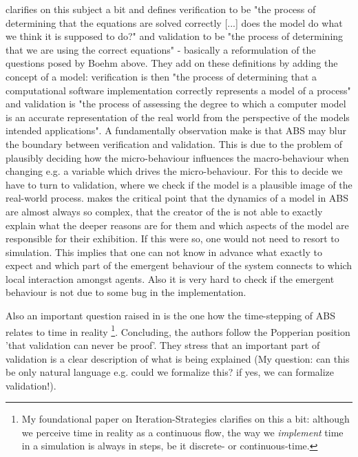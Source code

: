 \cite{ormerod_epistemological_2009} clarifies on this subject a bit and defines verification to be "the process of determining that the equations are solved correctly [...] does the model do what we think it is supposed to do?" and validation to be "the process of determining that we are using the correct equations" - basically a reformulation of the questions posed by Boehm \cite{boehm_software_1989} above. They add on these definitions by adding the concept of a model: verification is then "the process of determining that a computational software implementation correctly represents a model of a process" and validation is "the process of assessing the degree to which a computer model is an accurate representation of the real world from the perspective of the models intended applications".
A fundamentally observation \cite{ormerod_epistemological_2009} make is that ABS may blur the boundary between verification and validation. This is due to the problem of plausibly deciding how the micro-behaviour influences the macro-behaviour when changing e.g. a variable which drives the micro-behaviour. For this to decide we have to turn to validation, where we check if the model is a plausible image of the real-world process.
\cite{galan_errors_2009} makes the critical point that the dynamics of a model in ABS are almost always so complex, that the creator of the is not able to exactly explain what the deeper reasons are for them and which aspects of the model are responsible for their exhibition. If this were so, one would not need to resort to simulation. This implies that one can not know in advance what exactly to expect and which part of the emergent behaviour of the system connects to which local interaction amongst agents. Also it is very hard to check if the emergent behaviour is not due to some bug in the implementation.

Also an important question raised in \cite{ormerod_epistemological_2009} is the one how the time-stepping of ABS relates to time in reality \footnote{My foundational paper on Iteration-Strategies clarifies on this a bit: although we perceive time in reality as a continuous flow, the way we \textit{implement} time in a simulation is always in steps, be it discrete- or continuous-time.}. Concluding, the authors follow the Popperian position 'that validation can never be proof'. They stress that an important part of validation is a clear description of what is being explained (My question: can this be only natural language e.g. could we formalize this? if yes, we can formalize validation!).


